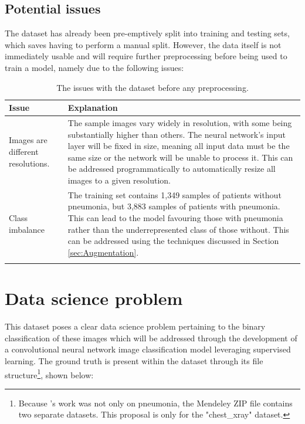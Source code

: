 \documentclass[12pt]{report}
\begin{document}
\subsection{Potential issues}\label{sec:DatasetIssues}
The dataset has already been pre-emptively split into training and testing sets, which saves having to perform a manual split. 
However, the data itself is not immediately usable and will require further preprocessing before being used to train a model, namely due to the 
following issues:

\begin{longtable}{ | p{} | p{} | }
    \hline
    \cellcolor{blue!25} Issue & \cellcolor{blue!25} Explanation \\
    \hline
    Images are different resolutions. & The sample images vary widely in resolution, with some being substantially higher than others.
    The neural network's input layer will be fixed in size, meaning all input data must be the 
    same size or the network will be unable to process it. This can be addressed programmatically to automatically resize 
    all images to a given resolution.\\
    \hline
    Class imbalance & The training set contains 1,349 samples of patients without pneumonia, but 3,883 samples of patients with pneumonia.
    This can lead to the model favouring those with pneumonia rather than the underrepresented class of those without. This can be addressed 
    using the techniques discussed in Section \ref{sec:Augmentation}.\\
    \hline
    \caption{The issues with the dataset before any preprocessing.}\label{tab:DatasetIssues}
\end{longtable}


\pagebreak 

\section{Data science problem}
This dataset poses a clear data science problem pertaining to the binary classification of these images which will be addressed through the 
development of a convolutional neural network image classification model leveraging supervised learning. 
The ground truth is present within the dataset through its file structure\footnote{Because \textcite
{kermanyIdentifyingMedicalDiagnoses2018}'s work was not only on pneumonia, the Mendeley ZIP file contains two 
separate datasets. This proposal is only for the "chest\_xray" dataset.}, shown below:
\end{document}

